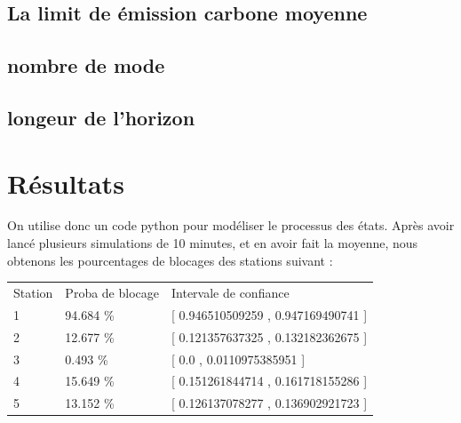 \documentclass[12pt,a4paper]{article}
\begin{document}
\subsection{La limit de émission carbone moyenne}
\subsection{nombre de mode}
\subsection{longeur de l'horizon}
\section{Résultats}

On utilise donc un code python pour modéliser le processus des états. Après avoir lancé plusieurs simulations de 10 minutes, et en avoir fait la moyenne, nous obtenons les pourcentages de blocages des stations suivant :

\begin{tabular}{ l l l }
	 Station & Proba de blocage & Intervale de confiance \\
   1 & 94.684 \% & [ 0.946510509259 , 0.947169490741 ] \\
   2 & 12.677 \% & [ 0.121357637325 , 0.132182362675 ] \\
   3 & 0.493 \% & [ 0.0 , 0.0110975385951 ] \\
   4 & 15.649 \% & [ 0.151261844714 , 0.161718155286 ] \\
   5 & 13.152 \% & [ 0.126137078277 , 0.136902921723 ] \\
 \end{tabular}
\end{document}
